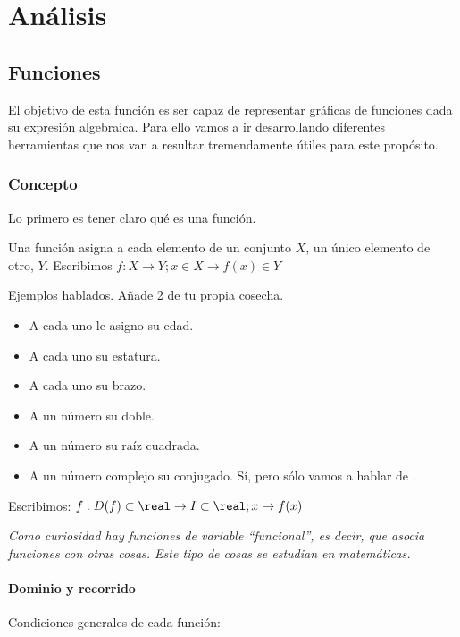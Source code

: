 
\chapter{Análisis}


\section{Funciones}

El objetivo de esta función es ser capaz de representar gráficas de funciones dada su expresión algebraica. 
%
Para ello vamos a ir desarrollando diferentes herramientas que nos van a resultar tremendamente útiles para este propósito.

\subsection{Concepto}

Lo primero es tener claro qué es una función.

\begin{defn}[Función]
Una función asigna a cada elemento de un conjunto $X$, un único elemento de otro, $Y$. Escribimos $f: X \to Y; x\in X\to f(x)\in Y$
\end{defn}

Ejemplos hablados. Añade 2 de tu propia cosecha.
\begin{itemize}
	\item A cada uno le asigno su edad.
	\item A cada uno su estatura.
	\item A cada uno su brazo.
	\item A un número su doble.
	\item A un número su raíz cuadrada.
\end{itemize}

\begin{itemize}
	\item A un número complejo su conjugado.
	\subitem Sí, pero sólo vamos a hablar de . 
\end{itemize}

Escribimos:  $f: D(f)\subset\real \to I\subset\real; x\to f(x)$

\textit{Como curiosidad hay funciones de variable ``funcional'', es decir, que asocia funciones con otras cosas. Este tipo de cosas se estudian en matemáticas.}


\subsubsection{Dominio y recorrido} Condiciones generales de cada función:

